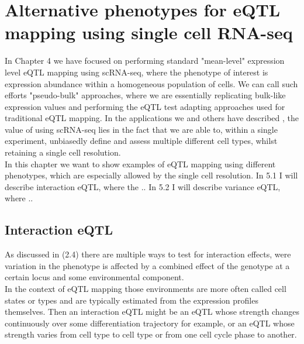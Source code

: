 
\chapter{Alternative phenotypes for eQTL mapping using single cell RNA-seq}

In Chapter 4 we have focused on performing standard "mean-level" expression level eQTL mapping using scRNA-seq, where the phenotype of interest is expression abundance within a homogeneous population of cells.
We can call such efforts "pseudo-bulk" approaches, where we are essentially replicating bulk-like expression values and performing the eQTL test adapting approaches used for traditional eQTL mapping. 
In the applications we and others have described \cite{van2018single,cuomo2020single}, the value of using scRNA-seq lies in the fact that we are able to, within a single experiment, unbiasedly define and assess multiple different cell types, whilst retaining a single cell resolution.\\

In this chapter we want to show examples of eQTL mapping using different phenotypes, which are especially allowed by the single cell resolution. 
In 5.1 I will describe interaction eQTL, where the ..
In 5.2 I will describe variance eQTL, where ..

\section{Interaction eQTL}

As discussed in (2.4) there are multiple ways to test for interaction effects, were variation in the phenotype is affected by a combined effect of the genotype at a certain locus and some environmental component.\\

In the context of eQTL mapping those environments are more often called cell states or types and are typically estimated from the expression profiles themselves. Then an interaction eQTL might be an eQTL whose strength changes continuously over some differentiation trajectory for example, or an eQTL whose strength varies from cell type to cell type or from one cell cycle phase to another.\\ 

